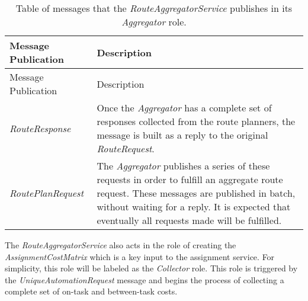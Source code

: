 \begin{longtable}[c]{@{}ll@{}}
\caption{Table of messages that the \emph{RouteAggregatorService}
publishes in its \emph{Aggregator} role.}\tabularnewline
\toprule
\begin{minipage}[b]{0.29\columnwidth}\raggedright\strut
Message Publication
\strut\end{minipage} &
\begin{minipage}[b]{0.65\columnwidth}\raggedright\strut
Description
\strut\end{minipage}\tabularnewline
\midrule
\endfirsthead
\toprule
\begin{minipage}[b]{0.29\columnwidth}\raggedright\strut
Message Publication
\strut\end{minipage} &
\begin{minipage}[b]{0.65\columnwidth}\raggedright\strut
Description
\strut\end{minipage}\tabularnewline
\midrule
\endhead
\begin{minipage}[t]{0.29\columnwidth}\raggedright\strut
\emph{RouteResponse}
\strut\end{minipage} &
\begin{minipage}[t]{0.65\columnwidth}\raggedright\strut
Once the \emph{Aggregator} has a complete set of responses collected
from the route planners, the message is built as a reply to the original
\emph{RouteRequest}.
\strut\end{minipage}\tabularnewline
\begin{minipage}[t]{0.29\columnwidth}\raggedright\strut
\emph{RoutePlanRequest}
\strut\end{minipage} &
\begin{minipage}[t]{0.65\columnwidth}\raggedright\strut
The \emph{Aggregator} publishes a series of these requests in order to
fulfill an aggregate route request. These messages are published in
batch, without waiting for a reply. It is expected that eventually all
requests made will be fulfilled.
\strut\end{minipage}\tabularnewline
\bottomrule
\end{longtable}

The \emph{RouteAggregatorService} also acts in the role of creating the
\emph{AssignmentCostMatrix} which is a key input to the assignment
service. For simplicity, this role will be labeled as the
\emph{Collector} role. This role is triggered by the
\emph{UniqueAutomationRequest} message and begins the process of
collecting a complete set of on-task and between-task costs.

